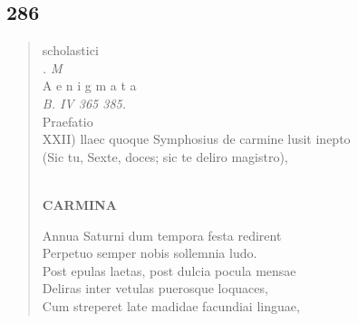 \documentclass[11pt, a4paper]{report}
\begin{document}
            \subsection*{286}
      \begin{verse}
      scholastici \\ \textit{. M} \\ A e n i g m a t a \\ \textit{B. IV 365 385.} \\ Praefatio \\  \lbrack XXII) llaec quoque Symphosius de carmine lusit inepto \\ (Sic tu, Sexte, doces; sic te deliro magistro), \\ 
        ﻿\pagebreak 
    \begin{center} \textbf{CARMINA} \end{center} \marginpar{[222]} Annua Saturni dum tempora festa redirent \\ Perpetuo semper nobis sollemnia ludo. \\ Post epulas laetas, post dulcia pocula mensae \\ Deliras inter vetulas puerosque loquaces, \\ Cum streperet late madidae facundiai linguae, \\ 
      \end{verse}
  
\end{document}
